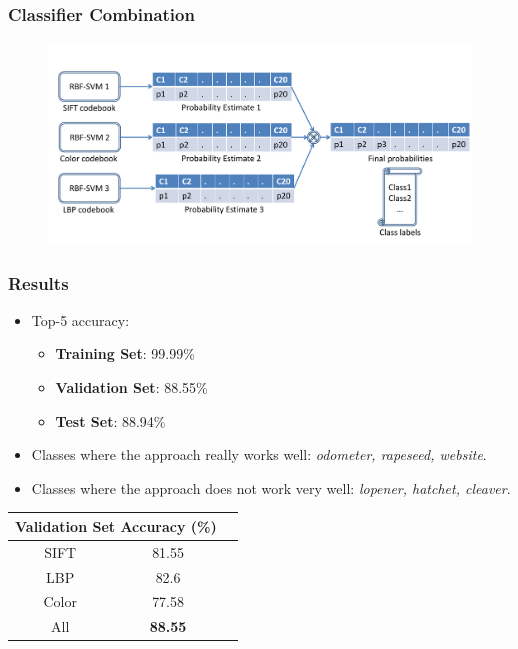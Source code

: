 \documentclass{beamer}
\begin{document}
\begin{frame}
\frametitle{Classifier Combination}
\begin{figure}
\includegraphics[width = 1\textwidth]{classifiercombination}
\end{figure}
\end{frame}

\begin{frame}
\frametitle{Results}
\begin{itemize}
\item<1-3> Top-5 accuracy:
\begin{itemize}
\item \textbf{Training Set}: 99.99\%
\item \textbf{Validation Set}: 88.55\%
\item \textbf{Test Set}: 88.94\%
\end{itemize}
\item<2-3> Classes where the approach really works well: \textit{odometer, rapeseed, website}.
\item<3> Classes where the approach does not work very well: \textit{lopener, hatchet, cleaver}.
\end{itemize}

\begin{center}
\begin{tabular}[]{| c | c | c | }
\hline
\multicolumn{2}{|c|}{\textbf{Validation Set Accuracy} (\%)} \\
\hline
SIFT & 81.55\\
\hline
LBP & 82.6\\
\hline
Color & 77.58\\
\hline
All & \textbf{88.55}\\
\hline
\end{tabular}
\end{center}

\end{frame}
\end{document}
